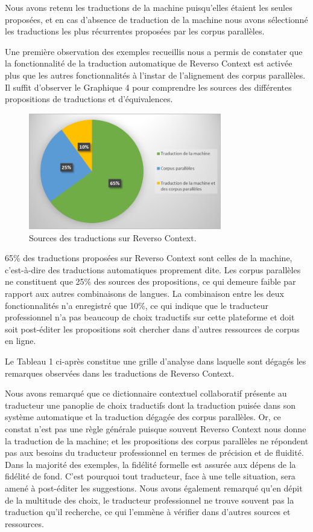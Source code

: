 \documentclass{textolivre}
\begin{document}
Nous avons retenu les traductions de la machine puisqu’elles étaient les seules proposées, et en cas d’absence de traduction de la machine nous avons sélectionné les traductions les plus récurrentes proposées par les corpus parallèles.

Une première observation des exemples recueillis nous a permis de constater que la fonctionnalité de la traduction automatique de Reverso Context est activée plus que les autres fonctionnalités à l’instar de l’alignement des corpus parallèles. Il suffit d’observer le Graphique 4 pour comprendre les sources des différentes propositions de traductions et d’équivalences.

\begin{figure}[htbp]
 \centering
 \includegraphics[width=0.75\textwidth]{figure09.pdf}
 \caption{Sources des traductions sur Reverso Context.}
 \label{fig-09}
\end{figure}

65\% des traductions proposées sur Reverso Context sont celles de la machine, c’est-à-dire des traductions automatiques proprement dite. Les corpus parallèles ne constituent que 25\% des sources des propositions, ce qui demeure faible par rapport aux autres combinaisons de langues. La combinaison entre les deux fonctionnalités n’a enregistré que 10\%, ce qui indique que le traducteur professionnel n’a pas beaucoup de choix traductifs sur cette plateforme et doit soit post-éditer les propositions soit chercher dans d’autres ressources de corpus en ligne.

Le Tableau 1 ci-après constitue une grille d’analyse dans laquelle sont dégagés les remarques observées dans les traductions de Reverso Context.



Nous avons remarqué que ce dictionnaire contextuel collaboratif présente au traducteur une panoplie de choix traductifs dont la traduction puisée dans son système automatique et la traduction dégagée des corpus parallèles. Or, ce constat n’est pas une règle générale puisque souvent Reverso Context nous donne la traduction de la machine; et les propositions des corpus parallèles ne répondent pas aux besoins du traducteur professionnel en termes de précision et de fluidité.  Dans la majorité des exemples, la fidélité formelle est assurée aux dépens de la fidélité de fond. C’est pourquoi tout traducteur, face à une telle situation, sera amené à post-éditer les suggestions. Nous avons également remarqué qu’en dépit de la multitude des choix, le traducteur professionnel ne trouve souvent pas la traduction qu’il recherche, ce qui l’emmène à vérifier dans d’autres sources et ressources.
\end{document}
